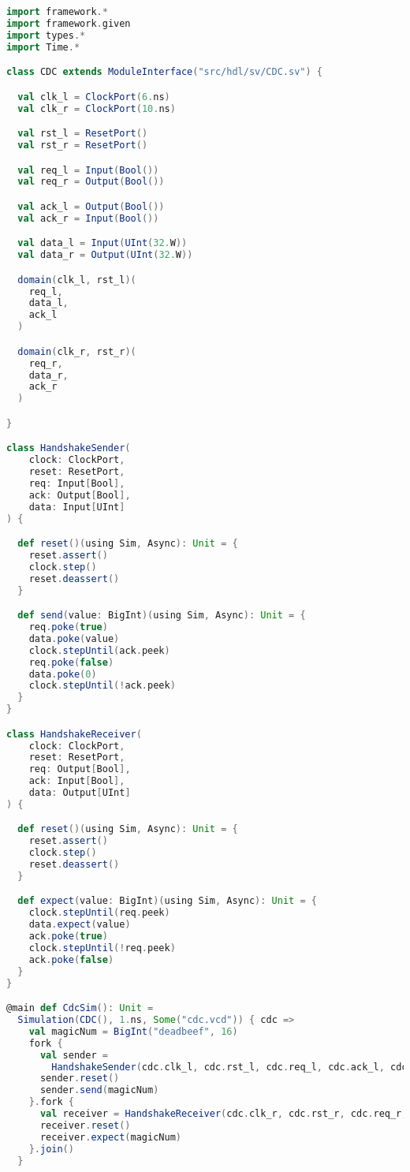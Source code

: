 \begin{lstlisting}[language=scala, captionpos=b, caption=Test code for the clock domain crossing circuit.,label=lst:cdc_test]
import framework.*
import framework.given
import types.*
import Time.*

class CDC extends ModuleInterface("src/hdl/sv/CDC.sv") {

  val clk_l = ClockPort(6.ns)
  val clk_r = ClockPort(10.ns)

  val rst_l = ResetPort()
  val rst_r = ResetPort()

  val req_l = Input(Bool())
  val req_r = Output(Bool())

  val ack_l = Output(Bool())
  val ack_r = Input(Bool())

  val data_l = Input(UInt(32.W))
  val data_r = Output(UInt(32.W))

  domain(clk_l, rst_l)(
    req_l,
    data_l,
    ack_l
  )

  domain(clk_r, rst_r)(
    req_r,
    data_r,
    ack_r
  )

}

class HandshakeSender(
    clock: ClockPort,
    reset: ResetPort,
    req: Input[Bool],
    ack: Output[Bool],
    data: Input[UInt]
) {

  def reset()(using Sim, Async): Unit = {
    reset.assert()
    clock.step()
    reset.deassert()
  }

  def send(value: BigInt)(using Sim, Async): Unit = {
    req.poke(true)
    data.poke(value)
    clock.stepUntil(ack.peek)
    req.poke(false)
    data.poke(0)
    clock.stepUntil(!ack.peek)
  }
}

class HandshakeReceiver(
    clock: ClockPort,
    reset: ResetPort,
    req: Output[Bool],
    ack: Input[Bool],
    data: Output[UInt]
) {

  def reset()(using Sim, Async): Unit = {
    reset.assert()
    clock.step()
    reset.deassert()
  }

  def expect(value: BigInt)(using Sim, Async): Unit = {
    clock.stepUntil(req.peek)
    data.expect(value)
    ack.poke(true)
    clock.stepUntil(!req.peek)
    ack.poke(false)
  }
}

@main def CdcSim(): Unit =
  Simulation(CDC(), 1.ns, Some("cdc.vcd")) { cdc =>
    val magicNum = BigInt("deadbeef", 16)
    fork {
      val sender =
        HandshakeSender(cdc.clk_l, cdc.rst_l, cdc.req_l, cdc.ack_l, cdc.data_l)
      sender.reset()
      sender.send(magicNum)
    }.fork {
      val receiver = HandshakeReceiver(cdc.clk_r, cdc.rst_r, cdc.req_r, cdc.ack_r, cdc.data_r)
      receiver.reset()
      receiver.expect(magicNum)
    }.join()
  }
\end{lstlisting}  
